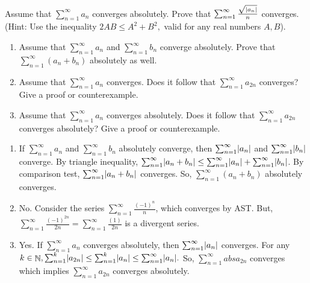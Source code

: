 \documentclass[12pt,letterpaper,boxed]{hmcpset}
\DeclareMathOperator{\N}{\mathbb{N}}
\DeclarePairedDelimiter\abs{\lvert}{\rvert}%
\begin{document}
\begin{solution}

\end{solution}


\begin{problem}[Exercise 3.6]
Assume that $\sum_{n = 1}^{\infty} a_n$ converges absolutely. Prove that $\sum_{n =1}^{\infty} \frac{\sqrt{\abs{a_n}}}{n}$ converges. (Hint: Use the inequality $2AB \leq A^{2} + B^{2},$ valid for any real numbers $A, B$).
\end{problem}


\begin{solution}

\end{solution}


\begin{problem}[Exercise 3.7]
\begin{enumerate}
    \item Assume that $\sum_{n = 1}^{\infty} a_n$ and $\sum_{n = 1}^{\infty} b_n$ converge absolutely. Prove that $\sum_{n = 1}^{\infty} (a_n + b_n)$ absolutely as well.
    \item Assume that $\sum_{n = 1}^{\infty} a_n$ converges. Does it follow that $\sum_{n = 1}^{\infty} a_{2n}$ converges? Give a proof or counterexample.
    \item Assume that $\sum_{n = 1}^{\infty} a_n$ converges absolutely. Does it follow that $\sum_{n = 1}^{\infty} a_{2n}$ converges absolutely? Give a proof or counterexample.
\end{enumerate}
\end{problem}

\begin{solution}
\begin{enumerate}
    \item If $\sum_{n = 1}^{\infty} a_n$ and $\sum_{n = 1}^{\infty} b_n$ absolutely converge, then $\sum_{n = 1}^{\infty} \abs{a_n}$ and $\sum_{n = 1}^{\infty} \abs{b_n}$ converge. By triangle inequality, $\sum_{n = 1}^{\infty} \abs{a_n + b_n} \leq \sum_{n = 1}^{\infty} \abs{a_n} + \sum_{n = 1}^{\infty} \abs{b_n}$. By comparison test, $\sum_{n = 1}^{\infty} \abs{a_n + b_n}$ converges. So, $\sum_{n = 1}^{\infty} (a_n + b_n)$ absolutely converges.
    \item No. Consider the series $\sum_{n=1}^{\infty} \frac{(-1)^{n}}{n}$, which converges by AST. But, $\sum_{n=1}^{\infty} \frac{(-1)^{2n}}{2n}= \sum_{n=1}^{\infty} \frac{(1)}{2n}$ is a divergent series.
    \item Yes. If $\sum_{n = 1}^{\infty} a_n$ converges absolutely, then $\sum_{n = 1}^{\infty} \abs{a_n}$ converges. For any $k\in\N, \sum_{n = 1}^{k} \abs{a_{2n}} \leq \sum_{n = 1}^{k} \abs{a_n} \leq \sum_{n = 1}^{\infty} \abs{a_n}.$ So, $\sum_{n = 1}^{\infty} abs{a_{2n}}$ converges which implies $\sum_{n = 1}^{\infty} a_{2n}$ converges absolutely.
\end{enumerate}
\end{solution}
\end{document}
